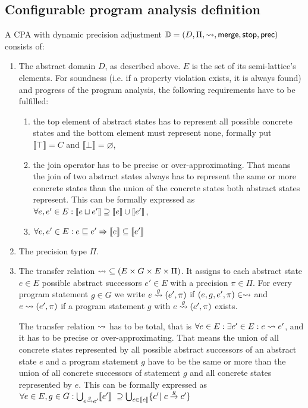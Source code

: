 \subsection{Configurable program analysis definition}
A CPA with dynamic precision adjustment $\mathbb{D} = (D, \Pi, \rightsquigarrow, \operatorname{\operatorname{\mathsf{merge}}}, \operatorname{\operatorname{\mathsf{stop}}}, \operatorname{\operatorname{\mathsf{prec}}} )$ consists of:

\begin{enumerate}[leftmargin=*, label=\arabic*.]
\item
The abstract domain $D$, as described above. $E$ is the set of its semi-lattice's elements.
For soundness (i.e. if a property violation exists, it is always found) and progress of the program analysis, the following requirements have to be fulfilled:\cite{Beyer2007}\cite{Beyer2008}
\begin{enumerate}[label=\alph*)]

\item
the top element of abstract states has to represent all possible concrete states and the bottom element must represent none, formally put $\llbracket \top \rrbracket = C$ and $\llbracket \bot \rrbracket = \varnothing$,

\item
the join operator has to be precise or over-approximating. That means the join of two abstract states always has to represent the same or more concrete states than the union of the concrete states both abstract states represent. This can be formally expressed as $\forall e, e' \in E: \llbracket e \sqcup e' \rrbracket \supseteq \llbracket e \rrbracket \cup \llbracket e' \rrbracket$,

\item
$\forall e, e' \in E : e \sqsubseteq e' \Rightarrow \llbracket e \rrbracket \subseteq \llbracket e' \rrbracket$
\end{enumerate}

\item
The precision type $\Pi$.

\item
The transfer relation $\transfer\ \subseteq (E \times G \times E \times \Pi)$. It assigns to each abstract state $e \in E$ possible abstract successors $e' \in E$ with a precision $\pi \in \Pi$.
For every program statement $g \in G$ we write $e \overset{g}{\rightsquigarrow} (e', \pi)$ if $(e, g, e', \pi) \in \rightsquigarrow$ and $e \rightsquigarrow (e', \pi)$ if a program statement $g$ with $e \overset{g}{\rightsquigarrow} (e', \pi)$ exists.

The transfer relation $\rightsquigarrow$ has to be total, that is $\forall e \in E: \exists e' \in E: e \rightsquigarrow e'$, and
it has to be precise or over-approximating. That means the union of all concrete states represented by all possible abstract successors of an abstract state $e$ and a program statement $g$ have to be the same or more than the union of all concrete successors of statement $g$ and all concrete states represented by $e$.
This can be formally expressed as $\forall e \in E, g \in G: \bigcup_{e \gtransfer e'} \llbracket e' \rrbracket\ \supseteq \bigcup_{c \in \llbracket e \rrbracket} \{ c' |\ c \overset{g}{\rightarrow} c' \}$


\end{enumerate}
